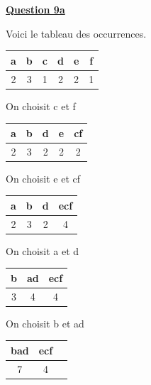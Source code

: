 \documentclass[a4paper,twoside,10pt]{article}
\newenvironment{Q}[1]{%
\vspace{1ex}
\underline{\textbf{Question #1\\}}
\newline
}{
\vspace{2ex}
}
\begin{document}
\begin{Q}{9a}
Voici le tableau des occurrences.

\begin{center}
\vspace{1ex}
\begin{tabular}{|c|c|c|c|c|c|}
\hline
a & b & c & d & e & f \\
\hline
2 & 3 & 1 & 2 & 2 & 1 \\
\hline
\end{tabular}
\vspace{1ex}
\end{center}

On choisit c et f

\begin{center}
\vspace{1ex}
\begin{tabular}{|c|c|c|c|c|}
\hline
a & b & d & e & cf \\
\hline
2 & 3 & 2 & 2 & 2 \\
\hline
\end{tabular}
\vspace{1ex}
\end{center}

On choisit e et cf

\begin{center}
\vspace{1ex}
\begin{tabular}{|c|c|c|c|}
\hline
a & b & d & ecf \\
\hline
2 & 3 & 2 & 4 \\
\hline
\end{tabular}
\vspace{1ex}
\end{center}

On choisit a et d

\begin{center}
\vspace{1ex}
\begin{tabular}{|c|c|c|}
\hline
b & ad & ecf \\
\hline
3 & 4 & 4 \\
\hline
\end{tabular}
\vspace{1ex}
\end{center}

On choisit b et ad

\begin{center}
\vspace{1ex}
\begin{tabular}{|c|c|c|}
\hline
bad & ecf \\
\hline
7 & 4 \\
\hline
\end{tabular}
\vspace{1ex}
\end{center}


\end{Q}
\end{document}
